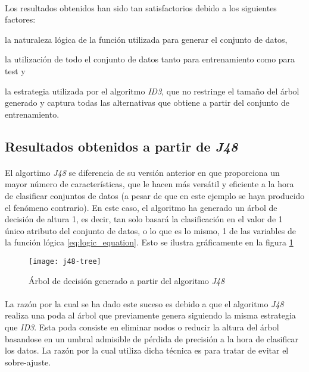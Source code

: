 \documentclass[10pt, a4paper,spanish]{article}
\begin{document}
			\paragraph{}
			Los resultados obtenidos han sido tan satisfactorios debido a los siguientes factores:
			\begin{enumerate*}[label=\itshape\alph*\upshape)]
				\item la naturaleza lógica de la función utilizada para generar el conjunto de datos,
				\item la utilización de todo el conjunto de datos tanto para entrenamiento como para test y
				\item la estrategia utilizada por el algoritmo \emph{ID3}, que no restringe el tamaño del árbol generado y captura todas las alternativas que obtiene a partir del conjunto de entrenamiento.
			\end{enumerate*}

		\subsection{Resultados obtenidos a partir de \emph{J48}}

			\paragraph{}
			El algortimo \emph{J48} se diferencia de su versión anterior en que proporciona un mayor número de características, que le hacen más versátil y eficiente a la hora de clasificar conjuntos de datos (a pesar de que en este ejemplo se haya producido el fenómeno contrario). En este caso, el algoritmo ha generado un árbol de decisión de altura 1, es decir, tan solo basará la clasificación en el valor de 1 único atributo del conjunto de datos, o lo que es lo mismo, 1 de las variables de la función lógica \eqref{eq:logic_equation}. Esto se ilustra gráficamente en la figura \ref{fig:j48-tree}

			\begin{figure}[h]
				\begin{center}
					\texttt{[image: j48-tree]}
				\end{center}
				\caption{Árbol de decisión generado a partir del algoritmo \emph{J48}}
				\label{fig:j48-tree}
			\end{figure}

			\paragraph{}
			La razón por la cual se ha dado este suceso es debido a que el algoritmo \emph{J48} realiza una poda al árbol que previamente genera siguiendo la misma estrategia que \emph{ID3}. Esta poda consiste en eliminar nodos o reducir la altura del árbol basandose en un umbral admisible de pérdida de precisión a la hora de clasificar los datos. La razón por la cual utiliza dicha técnica es para tratar de evitar el sobre-ajuste.
\end{document}
